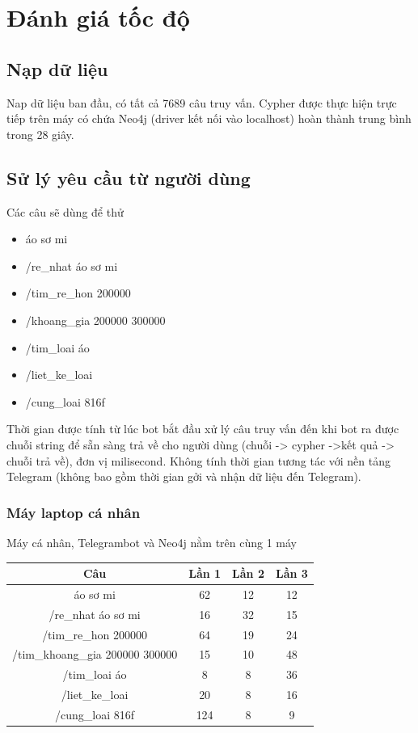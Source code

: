 \section{Đánh giá tốc độ} 

\subsection{Nạp dữ liệu}

Nap dữ liệu ban đầu, có tất cả 7689 câu truy vấn. Cypher được thực hiện trực tiếp trên máy có chứa Neo4j (driver kết nối vào localhost) hoàn thành trung bình trong 28 giây. 


\subsection{Sử lý yêu cầu từ người dùng}

Các câu sẽ dùng để thử 

\begin{itemize}
\item áo sơ mi
\item /re\_nhat áo sơ mi
\item /tim\_re\_hon 200000
\item /khoang\_gia 200000 300000
\item /tim\_loai áo
\item /liet\_ke\_loai
\item /cung\_loai 816f
\end{itemize}

Thời gian được tính từ lúc bot bắt đầu xử lý câu truy vấn đến khi bot ra được chuỗi string để sẵn sàng trả về cho người dùng (chuỗi -> cypher ->kết quả -> chuỗi trả về), đơn vị milisecond. Không tính thời gian tương tác với nền tảng Telegram (không bao gồm thời gian gởi và nhận dữ liệu đến Telegram). 

\subsubsection{Máy laptop cá nhân}
Máy cá nhân, Telegrambot và Neo4j nằm trên cùng 1 máy 

\begin{center}
 \begin{tabular}{||c c c c||} 
 \hline
Câu & Lần 1 & Lần 2 & Lần 3 \\ [0.5ex] 
 \hline
 \hline
áo sơ mi  & 62 & 12 & 12 \\ 
 \hline
/re\_nhat áo sơ mi & 16 & 32 & 15 \\
 \hline
 /tim\_re\_hon 200000 & 64 & 19 & 24 \\
 \hline
 /tim\_khoang\_gia 200000 300000 & 15 & 10 & 48 \\
 \hline
 /tim\_loai áo & 8 & 8 & 36 \\
 \hline
/liet\_ke\_loai & 20 & 8 & 16 \\
 \hline
  /cung\_loai 816f & 124 & 8  & 9 \\ [1ex] 
 \hline
\end{tabular}
\end{center}


